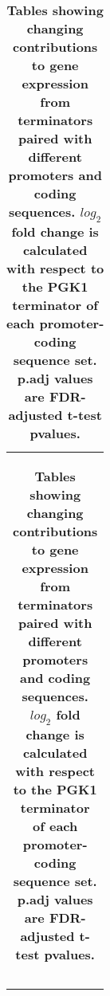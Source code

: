 \documentclass[../main.tex]{subfiles}
\begin{document}
\begin{table}[bh!]
{\begin{tabular}{ c }
\begin{tabularx}{0.8\textwidth} { 
  | >{\centering\arraybackslash}X 
  | >{\centering\arraybackslash}X 
  | >{\centering\arraybackslash}X | }
\hline
\end{tabularx} \\
\end{tabular}}\endgroup{}\caption[Tables showing changing contributions to gene expression from terminators paired with different promoters and coding sequences.]{\textbf{Tables showing changing contributions to gene expression from terminators paired with different promoters and coding sequences. $log_2$ fold change is calculated with respect to the PGK1 terminator of each promoter-coding sequence set. p.adj values are FDR-adjusted t-test pvalues.}}\label{tab:norm-terminator-mcherry-sig-effect}\end{table}

\begin{table}[ph!]
\def\arraystretch{1.25}
\centering 
\begingroup\setlength{\tabcolsep}{5pt}\fontsize{9}{9}
\end{table}
\end{document}
